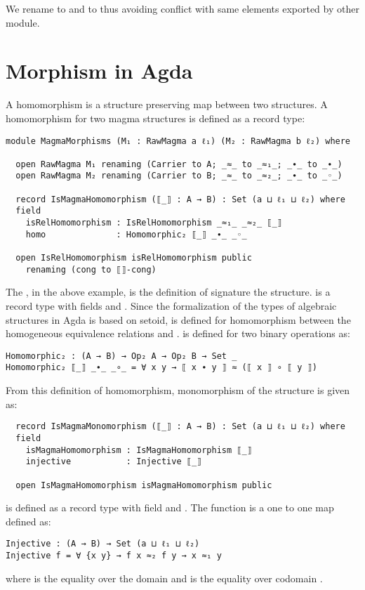 We rename   to  and   to
 thus avoiding conflict with same elements exported by other
module.

\section{Morphism in Agda}
A homomorphism is a structure preserving map between two structures. A
homomorphism for two magma structures is defined as a record type:
\begin{verbatim}
module MagmaMorphisms (M₁ : RawMagma a ℓ₁) (M₂ : RawMagma b ℓ₂) where

  open RawMagma M₁ renaming (Carrier to A; _≈_ to _≈₁_; _∙_ to _∙_)
  open RawMagma M₂ renaming (Carrier to B; _≈_ to _≈₂_; _∙_ to _◦_)

  record IsMagmaHomomorphism (⟦_⟧ : A → B) : Set (a ⊔ ℓ₁ ⊔ ℓ₂) where
  field
    isRelHomomorphism : IsRelHomomorphism _≈₁_ _≈₂_ ⟦_⟧
    homo              : Homomorphic₂ ⟦_⟧ _∙_ _◦_

  open IsRelHomomorphism isRelHomomorphism public
    renaming (cong to ⟦⟧-cong)
\end{verbatim}

The , in the above example,  is the
definition of signature the structure.  is a record
type with fields  and . Since the
formalization of the types of algebraic structures in Agda is based on setoid,
 is defined for homomorphism between the homogeneous
equivalence relations  and .  is
defined for two binary operations as:
\begin{verbatim}
Homomorphic₂ : (A → B) → Op₂ A → Op₂ B → Set _
Homomorphic₂ ⟦_⟧ _∙_ _∘_ = ∀ x y → ⟦ x ∙ y ⟧ ≈ (⟦ x ⟧ ∘ ⟦ y ⟧)
\end{verbatim}
From this definition of homomorphism, monomorphism of the structure is given as:

\begin{verbatim}
  record IsMagmaMonomorphism (⟦_⟧ : A → B) : Set (a ⊔ ℓ₁ ⊔ ℓ₂) where
  field
    isMagmaHomomorphism : IsMagmaHomomorphism ⟦_⟧
    injective           : Injective ⟦_⟧

  open IsMagmaHomomorphism isMagmaHomomorphism public
\end{verbatim}
 is defined as a record type with field
 and . The 
function is a one to one map defined as:
\begin{verbatim}
Injective : (A → B) → Set (a ⊔ ℓ₁ ⊔ ℓ₂)
Injective f = ∀ {x y} → f x ≈₂ f y → x ≈₁ y
\end{verbatim}
where  is the equality over the domain  and 
is the equality over codomain .


